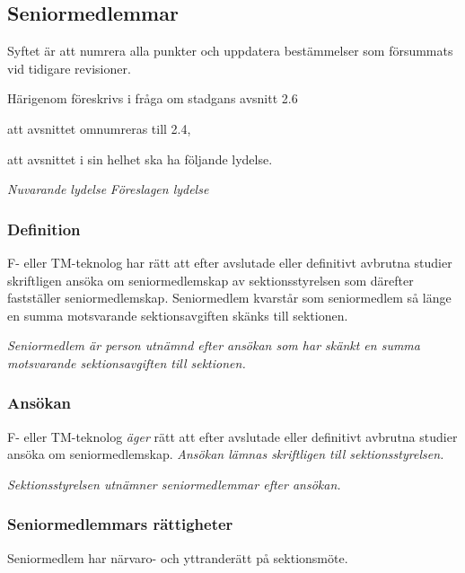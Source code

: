 \documentclass{article}
\newenvironment{lydelse}
    {\begin{paracol}{2}%
        \emph{Nuvarande lydelse}%
        \switchcolumn%
        \emph{Föreslagen lydelse}%
    \end{paracol}%
    \begin{enumerate}[label=\thesubsection.\arabic*]%
    \begin{paracol}{2}%
    }{\end{paracol}\end{enumerate}}
\newcommand{\itemb}{\item[\textbullet]}
\begin{document}
\subsection{Seniormedlemmar}
Syftet är att numrera alla punkter och uppdatera bestämmelser som försummats vid
tidigare revisioner.

Härigenom föreskrivs i fråga om stadgans avsnitt 2.6
\begin{dels}
    \item att avsnittet omnumreras till 2.4,
    \item att avsnittet i sin helhet ska ha följande lydelse.
\end{dels}

\begin{lydelse}%
    \subsubsection*{Definition}
    \itemb F- eller TM-teknolog har rätt att efter avslutade eller definitivt
      avbrutna studier skriftligen ansöka om seniormedlemskap av sektionsstyrelsen
      som därefter fastställer seniormedlemskap. Seniormedlem kvarstår som
      senior\-med\-lem så länge en summa motsvarande sektionsavgiften skänks till
      sektionen.

\switchcolumn
  \setcounter{enumi}{0}
    \item \emph{Seniormedlem är person utnämnd efter ansökan som har skänkt en
      summa motsvarande sektionsavgiften till sektionen.}
    
    \subsubsection*{Ansökan}
  
    \item F- eller TM-teknolog \emph{äger} rätt att efter avslutade eller definitivt
      avbrutna studier ansöka om seniormedlemskap.
      \emph{Ansökan lämnas skriftligen till sektionsstyrelsen.}
  
    \item \emph{Sektionsstyrelsen utnämner seniormedlemmar efter ansökan.}
    
\switchcolumn*
    \subsubsection*{Seniormedlemmars rättigheter}%
    \itemb Seniormedlem har närvaro- och yttranderätt på sektionsmöte.


\end{lydelse}
\end{document}
